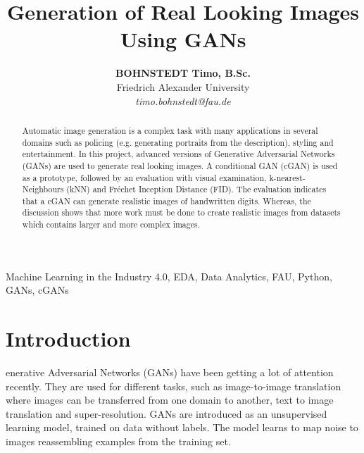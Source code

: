 \documentclass[journal]{IEEEtran}
\begin{document}
    \title{Generation of Real Looking Images Using GANs 
     }

  \author{\textbf{BOHNSTEDT Timo, B.Sc.} \\ Friedrich Alexander University \\ \textit{timo.bohnstedt@fau.de}%
}



\maketitle
\begin{abstract}
Automatic image generation is a complex task with many applications in several domains such as policing (e.g. generating portraits from the description), styling and entertainment. In this project, advanced versions of Generative Adversarial Networks (GANs) are used to generate real looking images. A conditional GAN (cGAN) is used as a prototype, followed by an evaluation with visual examination, k-nearest-Neighbours (kNN) and  Fréchet Inception Distance (FID). The evaluation indicates that a cGAN can generate realistic images of handwritten digits. Whereas, the discussion shows that more work must be done to create realistic images from datasets which contains larger and more complex images. 
\end{abstract}

\begin{IEEEkeywords}
Machine Learning in the Industry 4.0, EDA, Data Analytics, FAU, Python, GANs, cGANs
\end{IEEEkeywords}

\IEEEpeerreviewmaketitle

\section{Introduction}
enerative Adversarial Networks (GANs) have been getting a lot of attention recently. They are used for different tasks, such as image-to-image translation where images can be transferred from one domain to another, text to image translation and super-resolution. 
GANs are introduced as an unsupervised learning model, trained on data without labels. The model learns to map noise to images reassembling examples from the training set.
\end{document}
